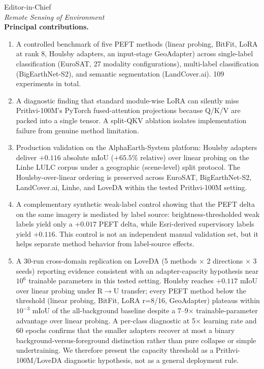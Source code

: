 \documentclass[11pt]{letter}
\begin{document}
\begin{letter}{%
  Editor-in-Chief \\
  \emph{Remote Sensing of Environment} \\
}
\textbf{Principal contributions.}
\begin{enumerate}
    \item A controlled benchmark of five PEFT methods (linear probing, BitFit, LoRA at rank 8, Houlsby adapters, an input-stage GeoAdapter) across single-label classification (EuroSAT, 27 modality configurations), multi-label classification (BigEarthNet-S2), and semantic segmentation (LandCover.ai). 109 experiments in total.
    \item A diagnostic finding that standard module-wise LoRA can silently miss Prithvi-100M's PyTorch fused-attention projections because Q/K/V are packed into a single tensor. A split-QKV ablation isolates implementation failure from genuine method limitation.
    \item Production validation on the AlphaEarth-System platform: Houlsby adapters deliver $+0.116$ absolute mIoU ($+65.5\%$ relative) over linear probing on the Linhe LULC corpus under a geographic (scene-level) split protocol. The Houlsby-over-linear ordering is preserved across EuroSAT, BigEarthNet-S2, LandCover.ai, Linhe, and LoveDA within the tested Prithvi-100M setting.
    \item A complementary synthetic weak-label control showing that the PEFT delta on the same imagery is mediated by label source: brightness-thresholded weak labels yield only a $+0.017$ PEFT delta, while Esri-derived supervisory labels yield $+0.116$. This control is not an independent manual validation set, but it helps separate method behavior from label-source effects.
    \item A 30-run cross-domain replication on LoveDA (5 methods $\times$ 2 directions $\times$ 3 seeds) reporting evidence consistent with an adapter-capacity hypothesis near $10^6$ trainable parameters in this tested setting. Houlsby reaches $+0.117$ mIoU over linear probing under R$\rightarrow$U transfer; every PEFT method below the threshold (linear probing, BitFit, LoRA r=8/16, GeoAdapter) plateaus within $10^{-3}$ mIoU of the all-background baseline despite a 7--9$\times$ trainable-parameter advantage over linear probing. A per-class diagnostic at 5$\times$ learning rate and 60 epochs confirms that the smaller adapters recover at most a binary background-versus-foreground distinction rather than pure collapse or simple undertraining. We therefore present the capacity threshold as a Prithvi-100M/LoveDA diagnostic hypothesis, not as a general deployment rule.
\end{enumerate}


\end{letter}
\end{document}
